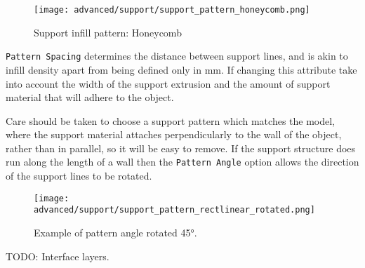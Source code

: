 \begin{figure}[H]
\centering
\texttt{[image: advanced/support/support\_pattern\_honeycomb.png]}
\caption{Support infill pattern: Honeycomb}
\label{fig:support_pattern_honeycomb}
\end{figure}

\texttt{Pattern Spacing} determines the distance between support lines, and is akin to infill density apart from being defined only in mm.  If changing this attribute take into account the width of the support extrusion and the amount of support material that will adhere to the object.

Care should be taken to choose a support pattern which matches the model, where the support material attaches perpendicularly to the wall of the object, rather than in parallel, so it will be easy to remove.  If the support structure does run along the length of a wall then the \texttt{Pattern Angle} option allows the direction of the support lines to be rotated.

\begin{figure}[H]
\centering
\texttt{[image: advanced/support/support\_pattern\_rectlinear\_rotated.png]}
\caption{Example of pattern angle rotated 45°.}
\label{fig:support_pattern_rectlinear_rotated}
\end{figure}


TODO: Interface layers.


